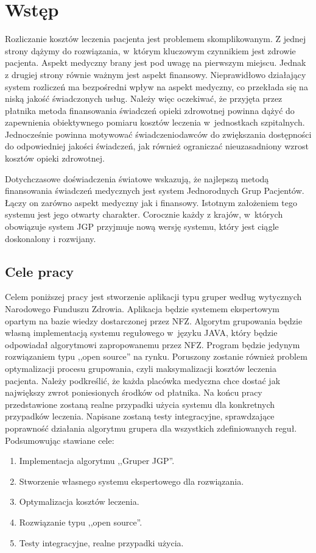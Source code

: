 \chapter{Wstęp}
\label{cha:wstep}

Rozliczanie kosztów leczenia pacjenta jest problemem skomplikowanym. Z jednej strony dążymy do rozwiązania, w~którym kluczowym czynnikiem jest zdrowie pacjenta. Aspekt medyczny brany jest pod uwagę na pierwszym miejscu. Jednak z drugiej strony równie ważnym jest aspekt finansowy. Nieprawidłowo działający system rozliczeń ma bezpośredni wpływ na aspekt medyczny, co przekłada się na niską jakość świadczonych usług. Należy więc oczekiwać, że przyjęta przez płatnika metoda finansowania świadczeń opieki zdrowotnej powinna dążyć do zapewnienia obiektywnego pomiaru kosztów leczenia w~jednostkach szpitalnych. Jednocześnie powinna motywować świadczeniodawców do zwiększania dostępności do odpowiedniej jakości świadczeń, jak również ograniczać nieuzasadniony wzrost kosztów opieki zdrowotnej.

Dotychczasowe doświadczenia światowe wskazują, że najlepszą metodą finansowania świadczeń medycznych jest system Jednorodnych Grup Pacjentów. Łączy on zarówno aspekt medyczny jak i finansowy. Istotnym założeniem tego systemu jest jego otwarty charakter. Corocznie każdy z krajów, w~których obowiązuje system JGP przyjmuje nową wersję systemu, który jest ciągle doskonalony i rozwijany.


\section{Cele pracy}
\label{sec:celePracy}

Celem poniższej pracy jest stworzenie aplikacji typu gruper według wytycznych Narodowego Funduszu Zdrowia. Aplikacja będzie systemem ekspertowym opartym na bazie wiedzy dostarczonej przez NFZ. Algorytm grupowania będzie własną implementacją systemu regułowego w~języku JAVA, który będzie odpowiadał algorytmowi zapropowanemu przez NFZ. Program będzie jedynym rozwiązaniem typu ,,open source'' na rynku. Poruszony zostanie również problem optymalizacji procesu grupowania, czyli maksymalizacji kosztów leczenia pacjenta. Należy podkreślić, że każda placówka medyczna chce dostać jak największy zwrot poniesionych środków od płatnika. Na końcu pracy przedstawione zostaną realne przypadki użycia systemu dla konkretnych przypadków leczenia. Napisane zostaną testy integracyjne, sprawdzające poprawność działania algorytmu grupera dla wszystkich zdefiniowanych reguł. 
Podsumowując stawiane cele:
\begin{enumerate}
\item Implementacja algorytmu ,,Gruper JGP''.
\item Stworzenie własnego systemu ekspertowego dla rozwiązania.
\item Optymalizacja kosztów leczenia.
\item Rozwiązanie typu ,,open source''.
\item Testy integracyjne, realne przypadki użycia.
\end{enumerate}


